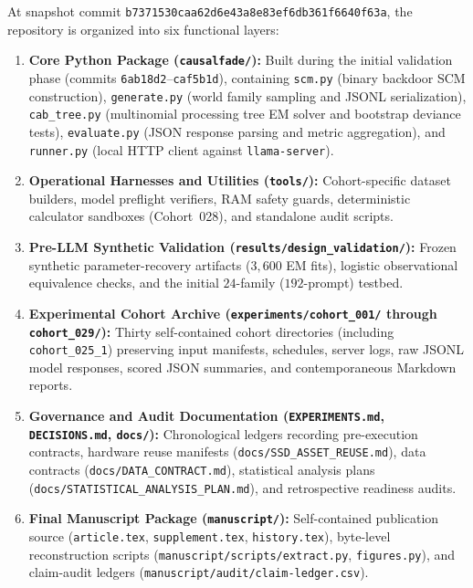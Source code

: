 At snapshot commit \nolinkurl{b7371530caa62d6e43a8e83ef6db361f6640f63a}, the repository is organized into six functional layers:
\begin{enumerate}
  \item \textbf{Core Python Package (\texttt{causalfade/}):} Built during the initial validation phase (commits \texttt{6ab18d2}--\texttt{caf5b1d}), containing \texttt{scm.py} (binary backdoor SCM construction), \texttt{generate.py} (world family sampling and JSONL serialization), \texttt{cab\_tree.py} (multinomial processing tree EM solver and bootstrap deviance tests), \texttt{evaluate.py} (JSON response parsing and metric aggregation), and \texttt{runner.py} (local HTTP client against \texttt{llama-server}).
  \item \textbf{Operational Harnesses and Utilities (\texttt{tools/}):} Cohort-specific dataset builders, model preflight verifiers, RAM safety guards, deterministic calculator sandboxes (Cohort~028), and standalone audit scripts.
  \item \textbf{Pre-LLM Synthetic Validation (\texttt{results/design\_validation/}):} Frozen synthetic parameter-recovery artifacts ($3{,}600$ EM fits), logistic observational equivalence checks, and the initial $24$-family ($192$-prompt) testbed.
  \item \textbf{Experimental Cohort Archive (\texttt{experiments/cohort\_001/} through \texttt{cohort\_029/}):} Thirty self-contained cohort directories (including \texttt{cohort\_025\_1}) preserving input manifests, schedules, server logs, raw JSONL model responses, scored JSON summaries, and contemporaneous Markdown reports.
  \item \textbf{Governance and Audit Documentation (\texttt{EXPERIMENTS.md}, \texttt{DECISIONS.md}, \texttt{docs/}):} Chronological ledgers recording pre-execution contracts, hardware reuse manifests (\texttt{docs/SSD\_ASSET\_REUSE.md}), data contracts (\texttt{docs/DATA\_CONTRACT.md}), statistical analysis plans (\texttt{docs/STATISTICAL\_ANALYSIS\_PLAN.md}), and retrospective readiness audits.
  \item \textbf{Final Manuscript Package (\texttt{manuscript/}):} Self-contained publication source (\texttt{article.tex}, \texttt{supplement.tex}, \texttt{history.tex}), byte-level reconstruction scripts (\texttt{manuscript/scripts/extract.py}, \texttt{figures.py}), and claim-audit ledgers (\texttt{manuscript/audit/claim-ledger.csv}).
\end{enumerate}

